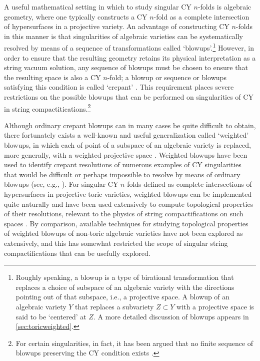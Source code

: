 \documentclass[11pt,oneside,english]{article}
\numberwithin{equation}{section}
\theoremstyle{definition}
\begin{document}
A useful mathematical setting in which to study singular CY $n$-folds is algebraic geometry, where one typically constructs a CY $n$-fold as a complete intersection of hypersurfaces in a projective variety. An advantage of constructing CY $n$-folds in this manner is that singularities of algebraic varieties can be systematically resolved by means of a sequence of transformations called `blowups'.\footnote{Roughly speaking, a blowup is a type of birational transformation that replaces a choice of subspace of an algebraic variety with the directions pointing out of that subspace, i.e., a projective space. A blowup of an algebraic variety $Y$ that replaces a subvariety $Z \subset Y$ with a projective space is said to be `centered' at $Z$. A more detailed discussion of blowups appears in \cref{sec:toricweighted}.} However, in order to ensure that the resulting geometry retains its physical interpretation as a string vacuum solution, any sequence of blowups must be chosen to ensure that the resulting space is also a CY $n$-fold; a blowup or sequence or blowups satisfying this condition is called `crepant' \cite{reid1983minimal}. This requirement places severe restrictions on the possible blowups that can be performed on singularities of CY in string compactitications.\footnote{For certain singularities, in fact, it has been argued that no finite sequence of blowups preserving the CY condition exists \cite{Arras:2016evy}.}

Although ordinary crepant blowups can in many cases be quite difficult to obtain, there fortunately exists a well-known and useful generalization called `weighted' blowups, in which each of point of a subspace of an algebraic variety is replaced, more generally, with a weighted projective space \cite{pub.1089196667,10.2307/2152704}. Weighted blowups have been used to identify crepant resolutions of numerous examples of CY singularities that would be difficult or perhaps impossible to resolve by means of ordinary blowups (see, e.g., \cite{Candelas:2000nc,Esole:2014hya}). For singular CY $n$-folds defined as complete intersections of hypersurfaces in projective toric varieties, weighted blowups can be implemented quite naturally and have been used extensively to compute topological properties of their resolutions, relevant to the physics of string compactifications on such spaces \cite{Braun:2014kla}. By comparison, available techniques for studying topological properties of weighted blowups of non-toric algebraic varieties have not been explored as extensively, and this has somewhat restricted the scope of singular string compactifications that can be usefully explored.
\end{document}
